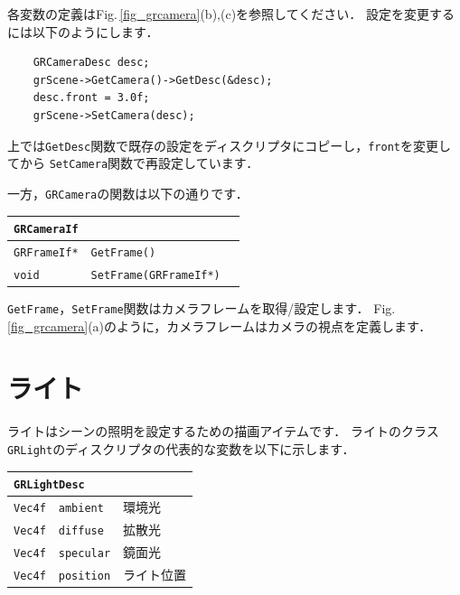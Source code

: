 \KLUDGE 各変数の定義はFig.\,\ref{fig_grcamera}(b),(c)\KLUDGE を参照してください．
\KLUDGE 設定を変更するには以下のようにします．
\begin{verbatim}
    GRCameraDesc desc;
    grScene->GetCamera()->GetDesc(&desc);
    desc.front = 3.0f;
    grScene->SetCamera(desc);
\end{verbatim}
\KLUDGE 上では\texttt{GetDesc}\KLUDGE 関数で既存の設定をディスクリプタにコピーし，\texttt{front}\KLUDGE を変更してから
\texttt{SetCamera}\KLUDGE 関数で再設定しています．

\KLUDGE 一方，\texttt{GRCamera}\KLUDGE の関数は以下の通りです．

\begin{center}
\begin{tabular}{p{.15\hsize}p{.45\hsize}p{.3\hsize}}
\multicolumn{3}{l}{\texttt{GRCameraIf}}					\\ \midrule
\texttt{GRFrameIf*}	& \texttt{GetFrame()}				&	\\
\texttt{void}		& \texttt{SetFrame(GRFrameIf*)}		&	\\
\end{tabular}
\end{center}

\texttt{GetFrame}\KLUDGE ，\texttt{SetFrame}\KLUDGE 関数はカメラフレームを取得/\KLUDGE 設定します．
Fig.\,\ref{fig_grcamera}(a)\KLUDGE のように，カメラフレームはカメラの視点を定義します．

\section{\KLUDGE ライト}

\KLUDGE ライトはシーンの照明を設定するための描画アイテムです．
\KLUDGE ライトのクラス\texttt{GRLight}\KLUDGE のディスクリプタの代表的な変数を以下に示します．

\begin{center}
\begin{tabular}{p{.15\hsize}p{.45\hsize}p{.3\hsize}}
\multicolumn{3}{l}{\texttt{GRLightDesc}}				\\ \midrule
\texttt{Vec4f}	&	\texttt{ambient}	& \KLUDGE 環境光 		\\
\texttt{Vec4f}	&	\texttt{diffuse}	& \KLUDGE 拡散光 		\\
\texttt{Vec4f}	&	\texttt{specular}	& \KLUDGE 鏡面光		\\
\texttt{Vec4f}	&	\texttt{position}	& \KLUDGE ライト位置	\\
\end{tabular}
\end{center}

